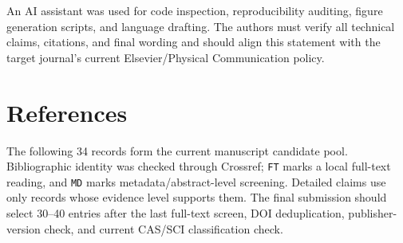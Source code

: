 \documentclass[10pt,twocolumn]{article}
\begin{document}
An AI assistant was used for code inspection, reproducibility auditing,
figure generation scripts, and language drafting. The authors must
verify all technical claims, citations, and final wording and should
align this statement with the target journal's current Elsevier/Physical
Communication policy.

\section*{References}\label{references-and-verification-status}

The following 34 records form the current manuscript candidate pool.
Bibliographic identity was checked through Crossref; \texttt{FT} marks a
local full-text reading, and \texttt{MD} marks metadata/abstract-level
screening. Detailed claims use only records whose evidence level
supports them. The final submission should select 30--40 entries after
the last full-text screen, DOI deduplication, publisher-version check,
and current CAS/SCI classification check.
\end{document}
